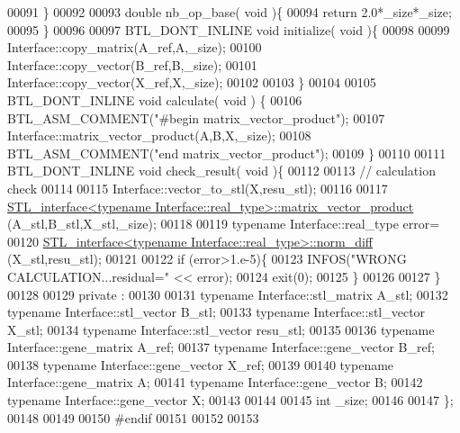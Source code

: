 \begin{DoxyCode}
00091   \}
00092 
00093   \textcolor{keywordtype}{double} nb\_op\_base( \textcolor{keywordtype}{void} )\{
00094     \textcolor{keywordflow}{return} 2.0*\_size*\_size;
00095   \}
00096 
00097   BTL\_DONT\_INLINE  \textcolor{keywordtype}{void} initialize( \textcolor{keywordtype}{void} )\{
00098 
00099     Interface::copy\_matrix(A\_ref,A,\_size);
00100     Interface::copy\_vector(B\_ref,B,\_size);
00101     Interface::copy\_vector(X\_ref,X,\_size);
00102 
00103   \}
00104 
00105   BTL\_DONT\_INLINE \textcolor{keywordtype}{void} calculate( \textcolor{keywordtype}{void} ) \{
00106       BTL\_ASM\_COMMENT(\textcolor{stringliteral}{"#begin matrix\_vector\_product"});
00107       Interface::matrix\_vector\_product(A,B,X,\_size);
00108       BTL\_ASM\_COMMENT(\textcolor{stringliteral}{"end matrix\_vector\_product"});
00109   \}
00110 
00111   BTL\_DONT\_INLINE \textcolor{keywordtype}{void} check\_result( \textcolor{keywordtype}{void} )\{
00112 
00113     \textcolor{comment}{// calculation check}
00114 
00115     Interface::vector\_to\_stl(X,resu\_stl);
00116 
00117     \hyperlink{class_s_t_l__interface}{STL\_interface<typename Interface::real\_type>::matrix\_vector\_product}
      (A\_stl,B\_stl,X\_stl,\_size);
00118 
00119     \textcolor{keyword}{typename} Interface::real\_type error=
00120       \hyperlink{class_s_t_l__interface}{STL\_interface<typename Interface::real\_type>::norm\_diff}
      (X\_stl,resu\_stl);
00121 
00122     \textcolor{keywordflow}{if} (error>1.e-5)\{
00123       INFOS(\textcolor{stringliteral}{"WRONG CALCULATION...residual="} << error);
00124       exit(0);
00125     \}
00126 
00127   \}
00128 
00129 private :
00130 
00131   \textcolor{keyword}{typename} Interface::stl\_matrix A\_stl;
00132   \textcolor{keyword}{typename} Interface::stl\_vector B\_stl;
00133   \textcolor{keyword}{typename} Interface::stl\_vector X\_stl;
00134   \textcolor{keyword}{typename} Interface::stl\_vector resu\_stl;
00135 
00136   \textcolor{keyword}{typename} Interface::gene\_matrix A\_ref;
00137   \textcolor{keyword}{typename} Interface::gene\_vector B\_ref;
00138   \textcolor{keyword}{typename} Interface::gene\_vector X\_ref;
00139 
00140   \textcolor{keyword}{typename} Interface::gene\_matrix A;
00141   \textcolor{keyword}{typename} Interface::gene\_vector B;
00142   \textcolor{keyword}{typename} Interface::gene\_vector X;
00143 
00144 
00145   \textcolor{keywordtype}{int} \_size;
00146 
00147 \};
00148 
00149 
00150 \textcolor{preprocessor}{#endif}
00151 
00152 
00153 
\end{DoxyCode}
